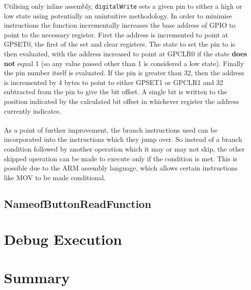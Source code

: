 \documentclass[a4paper, titlepage]{article}
\begin{document}
Utilising only inline assembly, \texttt{digitalWrite} sets a given pin to either a high or low state using potentially an unintuitive methodology. In order to minimise instructions the function incrementally increases the base address of GPIO to point to the necessary register. First the address is incremented to point at GPSET0, the first of the set and clear registers. The state to set the pin to is then evaluated, with the address increased to point at GPCLR0 if the state \textbf{does not} equal 1 (so any value passed other than 1 is considered a low state). Finally the pin number itself is evaluated. If the pin is greater than 32, then the address is incremented by 4 bytes to point to either GPSET1 or GPCLR1 and 32 subtracted from the pin to give the bit offset. A single bit is written to the position indicated by the calculated bit offset in whichever register the address currently indicates.
\\ \\
As a point of further improvement, the branch instructions used can be incorporated into the instructions which they jump over. So instead of a branch condition followed by another operation which it may or may not skip, the other skipped operation can be made to execute only if the condition is met. This is possible due to the ARM assembly language, which allows certain instructions like MOV to be made conditional.


\subsection{NameofButtonReadFunction}

\section{Debug Execution}

\section{Summary}
\end{document}
